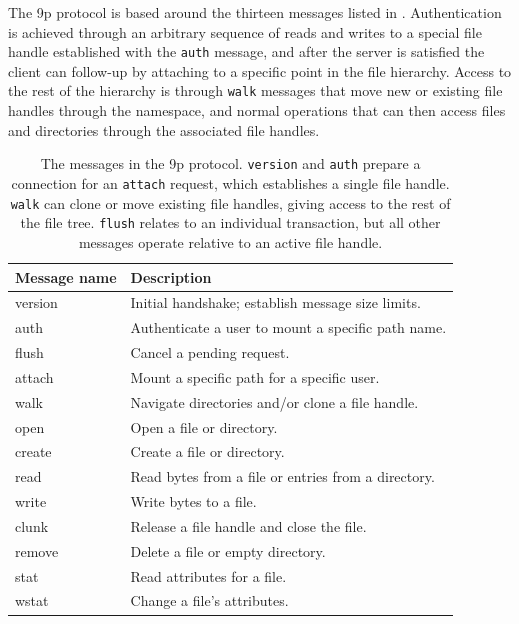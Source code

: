 The 9p protocol is based around the thirteen messages listed in . Authentication is achieved through an arbitrary sequence of reads and writes to a special file handle established with the \texttt{auth} message, and after the server is satisfied the client can follow-up by attaching to a specific point in the file hierarchy. Access to the rest of the hierarchy is through \texttt{walk} messages that move new or existing file handles through the namespace, and normal operations that can then access files and directories through the associated file handles.

\begin{table}[t]
\begin{center}
\begin{tabular}{>{\ttfamily}l|l}
\textbf{\textrm{Message name}} & \textbf{Description} \\ \hline
version & Initial handshake; establish message size limits. \\
auth & Authenticate a user to mount a specific path name. \\
flush & Cancel a pending request. \\
attach & Mount a specific path for a specific user. \\
walk & Navigate directories and/or clone a file handle. \\
open & Open a file or directory. \\
create & Create a file or directory. \\
read & Read bytes from a file or entries from a directory. \\
write & Write bytes to a file. \\
clunk & Release a file handle and close the file. \\
remove & Delete a file or empty directory. \\
stat & Read attributes for a file. \\
wstat & Change a file's attributes.
\end{tabular}
\end{center}
\caption[Messages in the 9p protocol]{The messages in the 9p protocol. \texttt{version} and \texttt{auth} prepare a connection for an \texttt{attach} request, which establishes a single file handle. \texttt{walk} can clone or move existing file handles, giving access to the rest of the file tree. \texttt{flush} relates to an individual transaction, but all other messages operate relative to an active file handle.}
\label{tab:9p-messages}
\end{table}

